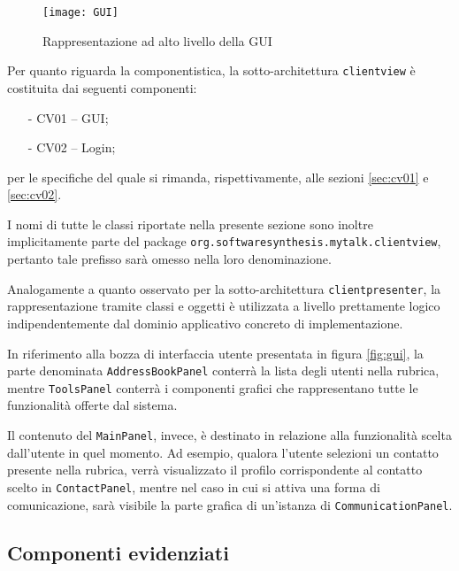 \begin{figure}[h]
  \centering
  \texttt{[image: GUI]}
  \caption{Rappresentazione ad alto livello della GUI}\label{fig:gui}
\end{figure}

Per quanto riguarda la componentistica, la sotto-architettura \texttt{clientview} è costituita dai seguenti componenti:
\begin{itemize}[noitemsep,nolistsep]
  \item[-] \textsf{CV01 -- GUI};
  \item[-] \textsf{CV02 -- Login};
\end{itemize}
per le specifiche del quale si rimanda, rispettivamente, alle sezioni \ref{sec:cv01} e \ref{sec:cv02}.

I nomi di tutte le classi riportate nella presente sezione sono inoltre implicitamente parte del package \texttt{org.softwaresynthesis.mytalk.clientview}, pertanto tale prefisso sarà omesso nella loro denominazione.

Analogamente a quanto osservato per la sotto-architettura \texttt{clientpresenter}, la rappresentazione tramite classi e oggetti è utilizzata a livello prettamente logico indipendentemente dal dominio applicativo concreto di implementazione.

In riferimento alla bozza di interfaccia utente presentata in figura \vref{fig:gui}, la parte denominata \texttt{AddressBookPanel} conterrà la lista degli utenti nella rubrica, mentre \texttt{ToolsPanel} conterrà i componenti grafici che rappresentano tutte le funzionalità offerte dal sistema. 

Il contenuto del \texttt{MainPanel}, invece, è destinato in relazione alla funzionalità scelta dall'utente in quel momento. Ad esempio, qualora l'utente selezioni un contatto presente nella rubrica, verrà visualizzato il profilo corrispondente al contatto scelto in \texttt{ContactPanel}, mentre nel caso in cui si attiva una forma di comunicazione, sarà visibile la parte grafica di un'istanza di \texttt{CommunicationPanel}.

\subsection{Componenti evidenziati}

